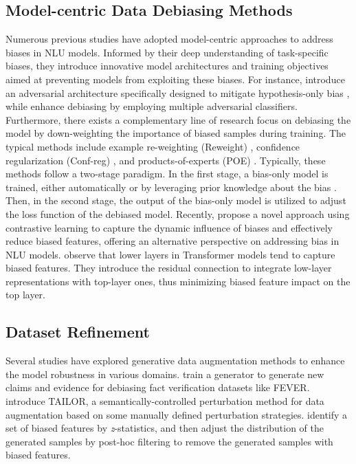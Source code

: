 \documentclass[11pt]{article}
\begin{document}
\subsection{Model-centric Data Debiasing Methods}
Numerous previous studies have adopted model-centric approaches to address biases in NLU models. 
Informed by their deep understanding of task-specific biases, they introduce innovative model architectures and training objectives aimed at preventing models from exploiting these biases.
For instance, \citet{belinkov-etal-2019-adversarial} introduce an adversarial architecture specifically designed to mitigate hypothesis-only bias \cite{gururangan-etal-2018-annotation}, while \citet{stacey-etal-2020-avoiding} enhance debiasing by employing multiple adversarial classifiers. Furthermore, there exists a complementary line of research focus on debiasing the model by down-weighting the importance of biased samples during training. The typical methods include example re-weighting (Reweight)  \cite{feversymm2019}, confidence regularization (Conf-reg) \cite{utama-etal-2020-mind, du2021towards}, and products-of-experts (POE) \cite{clark-etal-2019-dont, HeZW19_POE, karimi-mahabadi-etal-2020-end}. Typically, these methods follow a two-stage paradigm. In the first stage, a bias-only model is trained, either automatically \cite{utama-etal-2020-towards, geirhos2020shortcut,Sanh2021_ICLR} or by leveraging prior knowledge about the bias \cite{clark-etal-2019-dont,HeZW19_POE,belinkov-etal-2019-adversarial}. Then, in the second stage, the output of the bias-only model is utilized to adjust the loss function of the debiased model. Recently, \citet{lyu2022feature} propose a novel approach using contrastive learning to capture the dynamic influence of biases and effectively reduce biased features, offering an alternative perspective on addressing bias in NLU models. \citet{derc2023} observe that lower layers in Transformer models tend to capture biased features. They introduce the residual connection to integrate low-layer representations with top-layer ones, thus minimizing biased feature impact on the top layer.

\subsection{Dataset Refinement}
Several studies have explored generative data augmentation methods to enhance the model robustness in various domains. \citet{lee2021crossaug} train a generator to generate new
claims and evidence for debiasing fact verification
datasets like FEVER. \citet{ross2022} introduce TAILOR, a semantically-controlled perturbation method for data augmentation based on some manually defined perturbation strategies. \citet{wu2022generating} identify a set of biased features by \textit{z}-statistics, and then adjust the distribution of the generated samples by post-hoc filtering to remove the generated samples with biased features.
\end{document}
